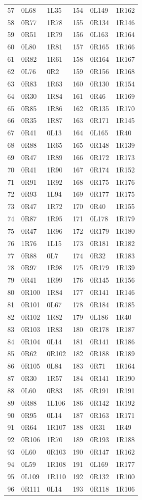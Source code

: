 \begin{longtable}{rll@{\qquad}rll}
57 & 0L68 & 1L35 & 154 & 0L149 & 1R162\\
58 & 0R77 & 1R78 & 155 & 0R134 & 1R146\\
59 & 0R51 & 1R79 & 156 & 0L163 & 1R164\\
60 & 0L80 & 1R81 & 157 & 0R165 & 1R166\\
61 & 0R82 & 1R61 & 158 & 0R164 & 1R167\\
62 & 0L76 & 0R2 & 159 & 0R156 & 1R168\\
63 & 0R83 & 1R63 & 160 & 0R130 & 1R154\\
64 & 0R30 & 1R84 & 161 & 0R46 & 1R169\\
65 & 0R85 & 1R86 & 162 & 0R135 & 1R170\\
66 & 0R35 & 1R87 & 163 & 0R171 & 1R145\\
67 & 0R41 & 0L13 & 164 & 0L165 & 1R40\\
68 & 0R88 & 1R65 & 165 & 0R148 & 1R139\\
69 & 0R47 & 1R89 & 166 & 0R172 & 1R173\\
70 & 0R41 & 1R90 & 167 & 0R174 & 1R152\\
71 & 0R91 & 1R92 & 168 & 0R175 & 1R176\\
72 & 0R93 & 1L94 & 169 & 0R177 & 1R175\\
73 & 0R47 & 1R72 & 170 & 0R40 & 1R155\\
74 & 0R87 & 1R95 & 171 & 0L178 & 1R179\\
75 & 0R47 & 1R96 & 172 & 0R179 & 1R180\\
76 & 1R76 & 1L15 & 173 & 0R181 & 1R182\\
77 & 0R88 & 0L7 & 174 & 0R32 & 1R183\\
78 & 0R97 & 1R98 & 175 & 0R179 & 1R139\\
79 & 0R41 & 1R99 & 176 & 0R145 & 1R156\\
80 & 0R100 & 1R84 & 177 & 0R141 & 1R146\\
81 & 0R101 & 0L67 & 178 & 0R184 & 1R185\\
82 & 0R102 & 1R82 & 179 & 0L186 & 1R40\\
83 & 0R103 & 1R83 & 180 & 0R178 & 1R187\\
84 & 0R104 & 0L14 & 181 & 0R141 & 1R186\\
85 & 0R62 & 0R102 & 182 & 0R188 & 1R189\\
86 & 0R105 & 0L84 & 183 & 0R71 & 1R164\\
87 & 0R30 & 1R57 & 184 & 0R141 & 1R190\\
88 & 0L60 & 0R83 & 185 & 0R191 & 1R191\\
89 & 0R88 & 1L106 & 186 & 0R142 & 1R192\\
90 & 0R95 & 0L14 & 187 & 0R163 & 1R171\\
91 & 0R64 & 1R107 & 188 & 0R31 & 1R49\\
92 & 0R106 & 1R70 & 189 & 0R193 & 1R188\\
93 & 0L60 & 0R103 & 190 & 0R147 & 1R162\\
94 & 0L59 & 1R108 & 191 & 0L169 & 1R177\\
95 & 0L109 & 1R110 & 192 & 0R132 & 1R100\\
96 & 0R111 & 0L14 & 193 & 0R118 & 1R106\\
\end{longtable}\endgroup
\clearpage
